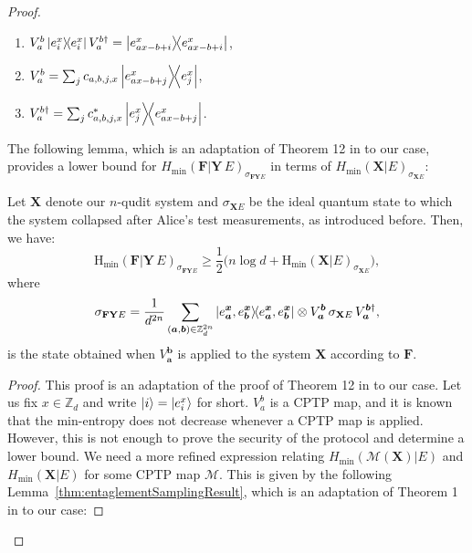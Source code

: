\begin{proof}
\begin{enumerate}%
    \item $V^b_a \ketbra{e^x_i} V^{b \dagger}_a = \ketbra{e^x_{ax - b + i}}$, \label{prop:a}
    \item $V^b_a = \sum_j c_{a,b,j,x} \ketbra{e^x_{ax - b + j}}{e^x_j}$,\label{prop:b}
    \item $V^{b\dagger}_a = \sum_j c_{a,b,j,x}^* \ketbra{e^x_j}{e^x_{ax - b + j}}$.\label{prop:c}
\end{enumerate}
The following lemma,  which is an adaptation of Theorem 12 in \cite{Dupuis2015} to our case, provides a lower bound for $H_\text{min}(\mathbf{F}|\mathbf{Y}\, E)_{\sigma_{\mathbf{F}\mathbf{Y} E}}$ in terms of $H_{\text{min}}(\mathbf{X} |E)_{\sigma_{\mathbf{X}E}}$:
\begin{lemma} 
\label{lem:GnBound}
Let $\mathbf{X}$ denote our $n$-qudit system and $\sigma_{\mathbf{X} E}$ be the ideal quantum state to which the system collapsed after Alice's test measurements, as introduced before. Then, we have:
\begin{equation*}
    \text{H}_\text{min}(\mathbf{F}|\mathbf{Y}\, E)_{\sigma_{\mathbf{F}\mathbf{Y} E}} \geq \frac{1}{2} \big(n\log d + \text{H}_\text{min}(\mathbf{X}| E)_{\sigma_{\mathbf{X} E}}\big),
\end{equation*}
where 
\begin{equation}
    \sigma_{\mathbf{F}\mathbf{Y} E} = \frac{1}{d^{2n}} \sum_{(\bm{a}, \bm{b}) \in \mathbb{Z}^{2n}_d} \ketbra{e^{\bm{x}}_{\bm{a}},e^{\bm{x}}_{\bm{b}}}\otimes V^{\bm{b}}_{\bm{a}} \, \sigma_{\mathbf{X} E}\,  V^{\bm{b}\dagger}_{\bm{a}},
    \label{eq:VappliedX}
\end{equation}
is the state obtained when $V^{\bm{b}}_{\bm{a}}$ is applied to the system $\mathbf{X}$ according to $\mathbf{F}$. 
\end{lemma}

\begin{proof}
This proof is an adaptation of the proof of Theorem 12 in \cite{Dupuis2015} to our case.
Let us fix $x\in\mathbb{Z}_d$ and write $| i \rangle = | e^x_i \rangle$  for short. 
 $V^b_a$ is a CPTP map, and it is known that the min-entropy does not decrease whenever a CPTP map is applied. However, this is not enough  to prove the security of the protocol and determine a lower bound. We need a more refined expression relating  $H_{\min}(\mathcal{M}(\mathbf{X})|E)$ and  $H_{\min}(\mathbf{X}|E)$ for some CPTP map $\mathcal{M}$. This is given by
 the following Lemma~\ref{thm:entaglementSamplingResult},  which is an adaptation of Theorem 1 in \cite{Dupuis2015} to our case:


\end{proof}
\end{proof}
